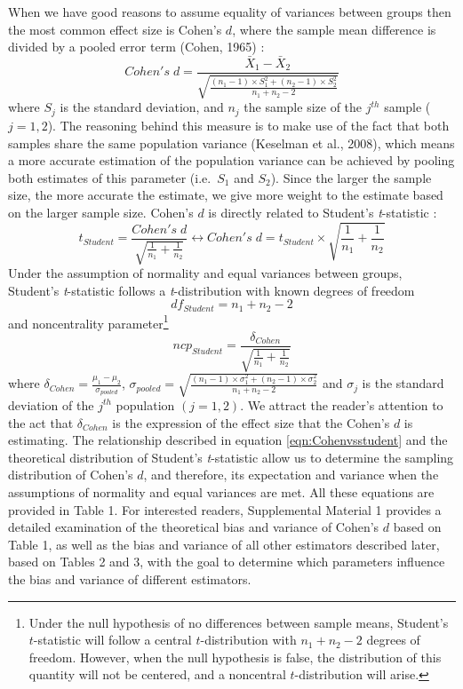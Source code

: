 \documentclass[
  english,
  man,floatsintext]{apa6}
\begin{document}
When we have good reasons to assume equality of variances between groups then the most common effect size is Cohen's \(d\), where the sample mean difference is divided by a pooled error term (Cohen, 1965) :
\begin{equation*} 
Cohen's \; d = \frac{\bar{X}_1-\bar{X}_2}{\sqrt{\frac{(n_1-1) \times S_1^2+(n_2-1) \times S_2^2}{n_1+n_2-2}}}
\label{eqn:Cohends}
\end{equation*}
where \(S_j\) is the standard deviation, and \(n_j\) the sample size of the \(j^{th}\) sample (\(j=1,2\)). The reasoning behind this measure is to make use of the fact that both samples share the same population variance (Keselman et al., 2008), which means a more accurate estimation of the population variance can be achieved by pooling both estimates of this parameter (i.e.~\(S_1\) and \(S_2\)). Since the larger the sample size, the more accurate the estimate, we give more weight to the estimate based on the larger sample size. Cohen's \(d\) is directly related to Student's \emph{t}-statistic :
\begin{equation} 
t_{Student}=\frac{Cohen's \; d}{\sqrt{\frac{1}{n_1}+\frac{1}{n_2}}}\leftrightarrow Cohen's \; d =  t_{Student} \times \sqrt{\frac{1}{n_1}+\frac{1}{n_2}}
\label{eqn:Cohenvsstudent}
\end{equation}
Under the assumption of normality and equal variances between groups, Student's \emph{t}-statistic follows a \emph{t}-distribution with known degrees of freedom
\begin{equation} 
df_{Student} = n_1+n_2-2
\label{eqn:studentdf}
\end{equation}
and noncentrality parameter\footnote{Under the null hypothesis of no differences between sample means, Student's $t$-statistic will follow a central $t$-distribution with $n_1+n_2-2$ degrees of freedom. However, when the null hypothesis is false, the distribution of this quantity will not be centered, and a noncentral $t$-distribution will arise.}
\[ncp_{Student} = \frac{\delta_{Cohen}}{\sqrt{\frac{1}{n_1}+\frac{1}{n_2}}}\]
where \(\delta_{Cohen}= \frac{\mu_1-\mu_2}{\sigma_{pooled}}\), \(\sigma_{pooled}= \sqrt{\frac{(n_1-1) \times \sigma^2_1+(n_2-1) \times \sigma^2_2}{n_1+n_2-2}}\) and \(\sigma_j\) is the standard deviation of the \(j^{th}\) population \((j=1,2)\). We attract the reader's attention to the act that \(\delta_{Cohen}\) is the expression of the effect size that the Cohen's \(d\) is estimating. The relationship described in equation \ref{eqn:Cohenvsstudent} and the theoretical distribution of Student's \emph{t}-statistic allow us to determine the sampling distribution of Cohen's \(d\), and therefore, its expectation and variance when the assumptions of normality and equal variances are met. All these equations are provided in Table 1. For interested readers, Supplemental Material 1 provides a detailed examination of the theoretical bias and variance of Cohen's \(d\) based on Table 1, as well as the bias and variance of all other estimators described later, based on Tables 2 and 3, with the goal to determine which parameters influence the bias and variance of different estimators.
\end{document}
